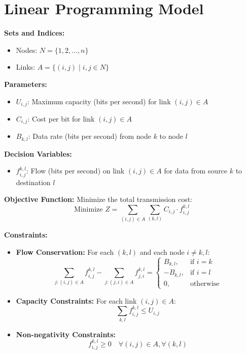 \documentclass{article}
\begin{document}
\section*{Linear Programming Model}

\textbf{Sets and Indices:}
\begin{itemize}
    \item Nodes: $N = \{1, 2, \ldots, n\}$
    \item Links: $A = \{(i, j) \mid i, j \in N\}$
\end{itemize}

\textbf{Parameters:}
\begin{itemize}
    \item $U_{i,j}$: Maximum capacity (bits per second) for link $(i,j) \in A$
    \item $C_{i,j}$: Cost per bit for link $(i,j) \in A$
    \item $B_{k,l}$: Data rate (bits per second) from node $k$ to node $l$
\end{itemize}

\textbf{Decision Variables:}
\begin{itemize}
    \item $f_{i,j}^{k,l}$: Flow (bits per second) on link $(i,j) \in A$ for data from source $k$ to destination $l$
\end{itemize}

\textbf{Objective Function:}
Minimize the total transmission cost:
\[
\text{Minimize } Z = \sum_{(i,j) \in A} \sum_{(k,l)} C_{i,j} \cdot f_{i,j}^{k,l}
\]

\textbf{Constraints:}
\begin{itemize}
    \item \textbf{Flow Conservation:} For each $(k,l)$ and each node $i \neq k,l$:
    \[
    \sum_{j: (i,j) \in A} f_{i,j}^{k,l} - \sum_{j: (j,i) \in A} f_{j,i}^{k,l} = 
    \begin{cases} 
    B_{k,l}, & \text{if } i = k \\
    -B_{k,l}, & \text{if } i = l \\
    0, & \text{otherwise}
    \end{cases}
    \]

    \item \textbf{Capacity Constraints:} For each link $(i,j) \in A$:
    \[
    \sum_{k,l} f_{i,j}^{k,l} \leq U_{i,j}
    \]

    \item \textbf{Non-negativity Constraints:} 
    \[
    f_{i,j}^{k,l} \geq 0 \quad \forall (i,j) \in A, \forall (k,l)
    \]
\end{itemize}
\end{document}

